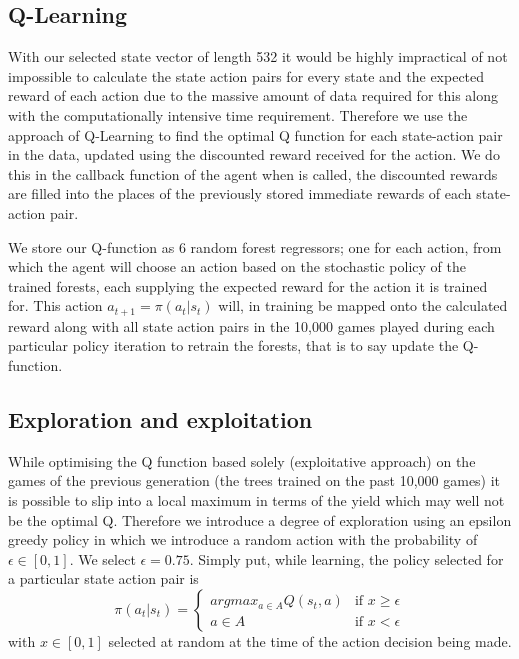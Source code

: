 	\subsection{Q-Learning}
	With our selected state vector of length 532 it would be highly impractical of not impossible to calculate the state action pairs for every state and the expected reward of each action due to the massive amount of data required for this along with the computationally intensive time requirement. Therefore we use the approach of Q-Learning to find the optimal Q function for each state-action pair in the data, updated using the discounted reward received for the action. We do this in the callback function of the agent when  is called, the discounted rewards are filled into the places of the previously stored immediate rewards of each state-action pair. 
	
	We store our Q-function as 6 random forest regressors; one for each action, from which the agent will choose an action based on the stochastic policy of the trained forests, each supplying the expected reward for the action it is trained for. This action $a_{t+1} = \pi(a_t|s_t)$ will, in training be mapped onto the calculated reward along with all state action pairs in the 10,000 games played during each particular policy iteration to retrain the forests, that is to say update the Q-function.
	
	\subsection{Exploration and exploitation}
	While optimising the Q function based solely (exploitative approach) on the games of the previous generation (the trees trained on the past 10,000 games) it is possible to slip into a local maximum in terms of the yield which may well not be the optimal Q. Therefore we introduce a degree of exploration using an epsilon greedy policy in which we introduce a random action with the probability of $\epsilon \in [0,1]$. We select $\epsilon = 0.75$. Simply put, while learning, the policy selected for a particular state action pair is 
	$$\pi(a_t|s_t) = \left\{
		\begin{array}{ll}
			argmax_{a \in A}Q(s_t,a)  & \mbox{if } x \geq \epsilon \\
			a \in A & \mbox{if } x < \epsilon
		\end{array}
	\right.$$
	with $x \in [0,1]$ selected at random at the time of the action decision being made.
	
